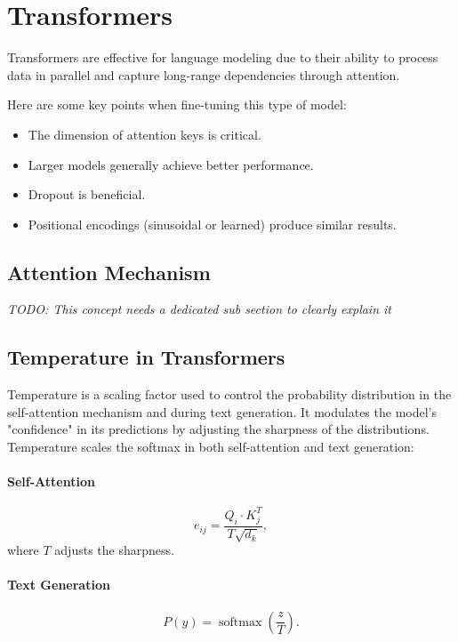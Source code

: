 \documentclass{article}
\begin{document}
\clearpage\newpage

\section{Transformers}
Transformers are effective for language modeling due to their ability to process data in parallel and capture long-range dependencies through attention.

Here are some key points when fine-tuning this type of model:
\begin{itemize}
    \item The dimension of attention keys is critical.
    \item Larger models generally achieve better performance.
    \item Dropout is beneficial.
    \item Positional encodings (sinusoidal or learned) produce similar results.
\end{itemize}

\subsection{Attention Mechanism}
\textit{TODO: This concept needs a dedicated sub section to clearly explain it}

\subsection{Temperature in Transformers}
Temperature is a scaling factor used to control the probability distribution in the self-attention mechanism and during text generation. It modulates the model’s "confidence" in its predictions by adjusting the sharpness of the distributions. Temperature scales the softmax in both self-attention and text generation:

\paragraph{Self-Attention}
\[
e_{ij} = \frac{Q_i \cdot K_j^T}{T\sqrt{d_k}},
\]
where \(T\) adjusts the sharpness.

\paragraph{Text Generation}
\[
P(y) = \operatorname{softmax}\left(\frac{z}{T}\right).
\]
\end{document}
